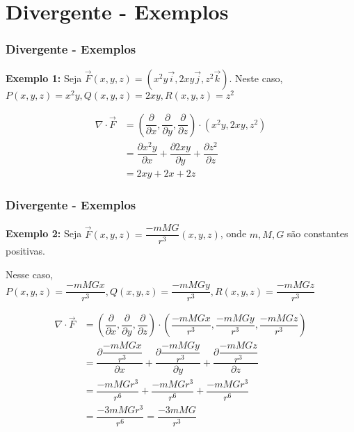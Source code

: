\section{Divergente - Exemplos}
\begin{frame}
    \frametitle{Divergente - Exemplos}
    \justifying
    \textbf{Exemplo 1:} Seja $\vec{F}(x,y,z)=(x^2y\vec{i}, 2xy\vec{j}, z^2\vec{k})$. Neste caso, $P(x,y,z)=x^2y, Q(x,y,z)=2xy, R(x,y,z)=z^2$
    
    \begin{align*}
        \nabla \cdot \vec{F} & =\left(
        \dfrac{\partial}{\partial x}, \dfrac{\partial}{\partial y}, \dfrac{\partial}{\partial z}
        \right) \cdot (x^2y,2xy,z^2)                                                                                                 \\[3mm]
                             & = \dfrac{\partial x^2y}{\partial x}+\dfrac{\partial 2xy}{\partial y}+\dfrac{\partial z^2}{\partial z} \\[3mm]
                             & = 2xy+2x+2z
    \end{align*}
    
\end{frame}

\begin{frame}
    \frametitle{Divergente - Exemplos}
    \justifying
    \textbf{Exemplo 2:} Seja $\vec{F}(x,y,z)=\dfrac{-mMG}{r^3}(x,y,z)$, onde $m, M, G$ são constantes positivas. 
    
    Nesse caso, $P(x,y,z)=\dfrac{-mMGx}{r^3}, Q(x,y,z)=\dfrac{-mMGy}{r^3}, R(x,y,z)=\dfrac{-mMGz}{r^3}$
    
    \begin{align*}
        \nabla \cdot \vec{F} & = \left(
        \dfrac{\partial}{\partial x}, \dfrac{\partial}{\partial y}, \dfrac{\partial}{\partial z}
        \right) \cdot \left(
        \dfrac{-mMGx}{r^3}, \dfrac{-mMGy}{r^3}, \dfrac{-mMGz}{r^3}
        \right)                                                                                                                                                                  \\[2mm]
                             & = \dfrac{\partial \dfrac{-mMGx}{r^3}}{\partial x}+\dfrac{\partial \dfrac{-mMGy}{r^3}}{\partial y}+\dfrac{\partial \dfrac{-mMGz}{r^3}}{\partial z} \\[2mm]
                             & = \dfrac{-mMGr^3}{r^6}+\dfrac{-mMGr^3}{r^6}+\dfrac{-mMGr^3}{r^6}                                                                                  \\[2mm]
                             & = \dfrac{-3mMGr^3}{r^6} = \dfrac{-3mMG}{r^3}
    \end{align*}
\end{frame}